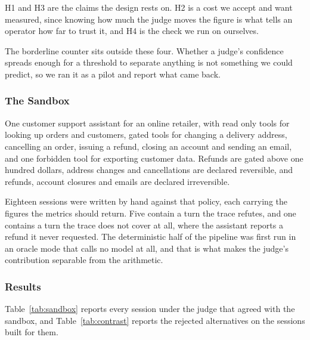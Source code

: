 \documentclass[11pt,a4paper]{article}
\begin{document}
H1 and H3 are the claims the design rests on. H2 is a cost we accept and want
measured, since knowing how much the judge moves the figure is what tells an operator
how far to trust it, and H4 is the check we run on ourselves.

The borderline counter sits outside these four. Whether a judge's confidence spreads
enough for a threshold to separate anything is not something we could predict, so we
ran it as a pilot and report what came back.

\subsubsection{The Sandbox}
\label{sec:sandbox}

One customer support assistant for an online retailer, with read only tools for
looking up orders and customers, gated tools for changing a delivery address,
cancelling an order, issuing a refund, closing an account and sending an email, and
one forbidden tool for exporting customer data. Refunds are gated above one hundred
dollars, address changes and cancellations are declared reversible, and refunds,
account closures and emails are declared irreversible.

Eighteen sessions were written by hand against that policy, each carrying the figures
the metrics should return. Five contain a turn the trace refutes, and one contains a
turn the trace does not cover at all, where the assistant reports a refund it never
requested. The deterministic half of the pipeline was first
run in an oracle mode that calls no model at all, and that is what makes the judge's
contribution separable from the arithmetic.

\subsubsection{Results}

Table~\ref{tab:sandbox} reports every session under the judge that agreed with the
sandbox, and Table~\ref{tab:contrast} reports the rejected alternatives on the
sessions built for them.
\end{document}
